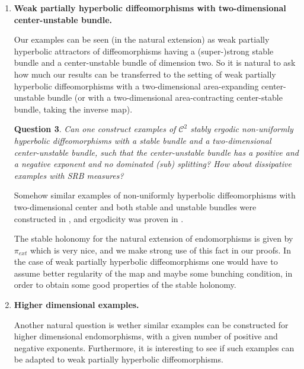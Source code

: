 \documentclass[11pt,letterpaper,reqno]{article}
\newtheorem{question}{Question}
\begin{document}
\begin{enumerate}
In our paper we consider endomorphisms which preserve the Lebesgue measure on the torus. Similar consideration can also be made for other invariant measures, once we have some control on the disintegrations of the lift to the natural extension along the fibers of $\pi_{ext}$. A natural question is the following.
\begin{question}
Can we deduce the nonuniform hyperbolicity and ergodicity for other meaningful invariant measures of our examples and dissipative perturbations of them? In particular nonuniform hyperbolicity and uniqueness of equilibrium states for some specific potentials?
\end{question}
Of special interest is the existence and uniqueness of SRB measures.
\begin{question}
Can we construct (robust) examples of dissipative endomorphisms on surfaces having (unique) non-uniformly hyperbolic SRB measures and no dominated splitting?
\end{question}
\item {\bf Weak partially hyperbolic diffeomorphisms with two-dimensional center-unstable bundle.}

Our examples can be seen (in the natural extension) as weak partially hyperbolic attractors of diffeomorphisms having a (super-)strong stable bundle and a center-unstable bundle of dimension two. So it is natural to ask how much our results can be transferred to the setting of weak partially hyperbolic diffeomorphisms with a two-dimensional area-expanding center-unstable bundle (or with a two-dimensional area-contracting center-stable bundle, taking the inverse map).

\begin{question}
Can one construct examples of $\mathcal C^2$ stably ergodic non-uniformly hyperbolic diffeomorphisms with a stable bundle and a two-dimensional center-unstable bundle, such that the center-unstable bundle has a positive and a negative exponent and no dominated (sub) splitting? How about dissipative examples with SRB measures?
\end{question}

Somehow similar examples of non-uniformly hyperbolic diffeomorphisms with two-dimensional center and both stable and unstable bundles were constructed in \cite{NUHD}, and ergodicity was proven in \cite{Obata}. 

The stable holonomy for the natural extension of endomorphisms is given by $\pi_{ext}$ which is very nice, and we make strong use of this fact in our proofs. In the case of weak partially hyperbolic diffeomorphisms one would have to assume better regularity of the map and maybe some bunching condition, in order to obtain some good properties of the stable holonomy. 
\item {\bf Higher dimensional examples.}

Another natural question is wether similar examples can be constructed for higher dimensional endomorphisms, with a given number of positive and negative exponents. Furthermore, it is interesting to see if such examples can be adapted to weak partially hyperbolic diffeomorphisms.
\end{enumerate}
\end{document}
